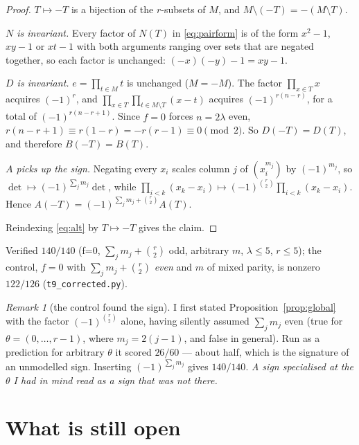 \documentclass[11pt]{article}
\theoremstyle{definition}
\theoremstyle{remark}
\newtheorem{remark}[theorem]{Remark}
\newcommand{\bftheta}{\theta}
\begin{document}
\begin{proof}
$T\mapsto-T$ is a bijection of the $r$-subsets of $M$, and
$M\setminus(-T)=-(M\setminus T)$.

\emph{$N$ is invariant.} Every factor of $N(T)$ in \eqref{eq:pairform} is of the form
$x^2-1$, $xy-1$ or $xt-1$ with both arguments ranging over sets that are negated
together, so each factor is unchanged: $(-x)(-y)-1=xy-1$.

\emph{$D$ is invariant.} $e=\prod_{t\in M}t$ is unchanged ($M=-M$). The factor
$\prod_{x\in T}x$ acquires $(-1)^{r}$, and
$\prod_{x\in T}\prod_{t\in M\setminus T}(x-t)$ acquires $(-1)^{r(n-r)}$, for a total of
$(-1)^{r(n-r+1)}$. Since $f=0$ forces $n=2\lambda$ even, $r(n-r+1)\equiv r(1-r)=-r(r-1)
\equiv0\pmod 2$. So $D(-T)=D(T)$, and therefore $B(-T)=B(T)$.

\emph{$A$ picks up the sign.} Negating every $x_i$ scales column $j$ of
$(x_i^{m_j})$ by $(-1)^{m_j}$, so $\det\mapsto(-1)^{\sum_j m_j}\det$, while
$\prod_{i<k}(x_k-x_i)\mapsto(-1)^{\binom r2}\prod_{i<k}(x_k-x_i)$. Hence
$A(-T)=(-1)^{\sum_jm_j+\binom r2}A(T)$.

Reindexing \eqref{eq:alt} by $T\mapsto-T$ gives the claim.
\end{proof}

Verified $140/140$ (f=0, $\sum_jm_j+\binom r2$ odd, arbitrary $m$, $\lambda\le5$,
$r\le5$); the control, $f=0$ with $\sum_jm_j+\binom r2$ \emph{even} and $m$ of mixed
parity, is nonzero $122/126$ (\texttt{t9\_corrected.py}).

\begin{remark}[the control found the sign]
I first stated Proposition~\ref{prop:global} with the factor $(-1)^{\binom r2}$ alone,
having silently assumed $\sum_jm_j$ even (true for $\bftheta=(0,\dots,r-1)$, where
$m_j=2(j-1)$, and false in general). Run as a prediction for arbitrary $\bftheta$ it
scored $26/60$ --- about half, which is the signature of an unmodelled sign. Inserting
$(-1)^{\sum_jm_j}$ gives $140/140$. \emph{A sign specialised at the $\bftheta$ I had in
mind read as a sign that was not there.}
\end{remark}

\section{What is still open}\label{sec:open}
\end{document}
